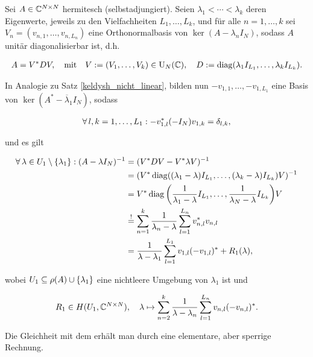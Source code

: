 \begin{remark} \label{keldysh_linear_hermitesch}

    Sei $A \in \mathbb{C}^{N \times N}$ hermitesch (selbstadjungiert).
    Seien $\lambda_1 < \cdots < \lambda_k$ deren Eigenwerte, jeweils zu den Vielfachheiten $L_1, \dots, L_k$, und für alle $n = 1, \dots, k$ sei $V_n = (v_{n, 1}, \dots, v_{n, L_n})$ eine Orthonormalbasis von $\ker (A - \lambda_n I_N)$, sodass $A$ unitär diagonalisierbar ist, d.h.

    \begin{align*}
        A = V^\ast D V,
        \quad
        \text{mit}
        \quad
        V := (V_1, \dots, V_k) \in \operatorname{U}_N(\mathbb{C}),
        \quad
        D := \operatorname{diag} (\lambda_1 I_{L_1}, \dots, \lambda_k I_{L_k}).
    \end{align*}

    In Analogie zu Satz \ref{keldysh_nicht_linear}, bilden nun $-v_{1, 1}, \dots, -v_{1, L_1}$ eine Basis von $\ker (A^\ast - \overline \lambda_1 I_N)$, sodass

    \begin{align*}
        \forall \, l, k = 1, \dots, L_1:
            -v_{1, l}^\ast (-I_N) v_{1, k} = \delta_{l, k},
    \end{align*}

    und es gilt

    \begin{align*}
        \forall \, \lambda \in U_1 \setminus {\left \{ \lambda_1 \right \}}:
            (A - \lambda I_N)^{-1}
            & =
            (V^\ast D V - V^\ast \lambda V)^{-1} \\
            & =
            (V^\ast \operatorname{diag} ((\lambda_1 - \lambda) I_{L_1}, \dots, (\lambda_k - \lambda) I_{L_k}) V)^{-1} \\
            & =
            V^\ast \operatorname{diag} {\left ( \frac{1}{\lambda_1 - \lambda} I_{L_1}, \dots, \frac{1}{\lambda_N - \lambda} I_{L_k} \right )} V \\
            & \stackrel{!}{=}
            \sum_{n=1}^k
                \frac{1}{\lambda_n - \lambda}
                \sum_{l=1}^{L_n}
                    v_{n, l}^\ast v_{n, l} \\
            & =
            \frac{1}{\lambda - \lambda_1}
            \sum_{l=1}^{L_1}
                v_{1, l} (-v_{1, l})^\ast
            +
            R_1(\lambda),
    \end{align*}

    wobei $U_1 \subseteq \rho(A) \cup {\left \{ \lambda_1 \right \}}$ eine nichtleere Umgebung von $\lambda_1$ ist und

    \begin{align*}
        R_1 \in H(U_1, \mathbb{C}^{N \times N}),
        \quad
        \lambda
        \mapsto
        \sum_{n=2}^k
            \frac{1}{\lambda - \lambda_n}
            \sum_{l=1}^{L_n}
                v_{n, l} (-v_{n, l})^\ast.
    \end{align*}

    Die Gleichheit mit dem \Quote{!} erhält man durch eine elementare, aber sperrige Rechnung.

\end{remark}
